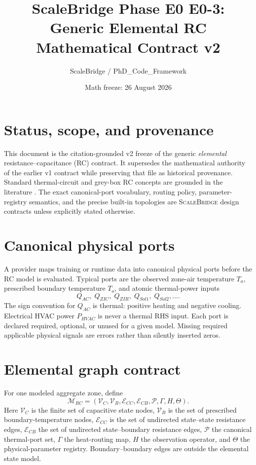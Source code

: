 \documentclass[11pt]{article}
\title{ScaleBridge Phase E0 E0-3: Generic Elemental RC Mathematical Contract v2}
\author{ScaleBridge / PhD\_Code\_Framework}
\date{Math freeze: 26 August 2026}
\newcommand{\ScaleBridge}{\textsc{ScaleBridge}}
\begin{document}
\maketitle

\section{Status, scope, and provenance}
This document is the citation-grounded v2 freeze of the generic \emph{elemental} resistance--capacitance (RC) contract.  It supersedes the mathematical authority of the earlier v1 contract while preserving that file as historical provenance.  Standard thermal-circuit and grey-box RC concepts are grounded in the literature \citep{GhiausAhmad2020ThermalCircuits,BacherMadsen2011HeatDynamics,WangChenLi2019RCSimplification,BelicSliskovicHocenski2021MultiZoneRC}.  The exact canonical-port vocabulary, routing policy, parameter-registry semantics, and the precise built-in topologies are \ScaleBridge{} design contracts unless explicitly stated otherwise.

\section{Canonical physical ports}
A provider maps training or runtime data into canonical physical ports before the RC model is evaluated.  Typical ports are the observed zone-air temperature $T_a$, prescribed boundary temperature $T_o$, and atomic thermal-power inputs
\[
Q_{AC},\;Q_{ZIC},\;Q_{ZIR},\;Q_{Sol1},\;Q_{Sol2},\ldots .
\]
The sign convention for $Q_{AC}$ is thermal: positive heating and negative cooling.  Electrical HVAC power $P_{HVAC}$ is never a thermal RHS input.  Each port is declared required, optional, or unused for a given model.  Missing required applicable physical signals are errors rather than silently inserted zeros.

\section{Elemental graph contract}
For one modeled aggregate zone, define
\[
\mathcal M_{RC}=(\mathcal V_C,\mathcal V_B,\mathcal E_{CC},\mathcal E_{CB},\mathcal P,\Gamma,H,\Theta).
\]
Here $\mathcal V_C$ is the finite set of capacitive state nodes, $\mathcal V_B$ is the set of prescribed boundary-temperature nodes, $\mathcal E_{CC}$ is the set of undirected state--state resistance edges, $\mathcal E_{CB}$ the set of undirected state--boundary resistance edges, $\mathcal P$ the canonical thermal-port set, $\Gamma$ the heat-routing map, $H$ the observation operator, and $\Theta$ the physical-parameter registry.  Boundary--boundary edges are outside the elemental state model.
\end{document}
